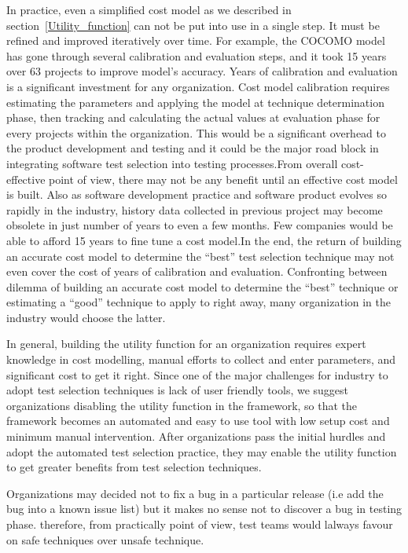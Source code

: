 In practice, even a simplified cost model as we described in
section~\ref{Utility_function} can not be put into use in a single step. It must
be refined and improved iteratively over time. For example, the COCOMO
model \cite{boehm2000software} has gone through several calibration and
evaluation steps, and it took 15 years over 63 projects to improve model's
accuracy. Years of calibration and evaluation is a significant investment for
any organization. Cost model calibration requires estimating the parameters and applying the model at technique determination phase, then tracking and calculating the actual values at evaluation phase for every projects within the organization. 
This would be a significant overhead to the product development and testing and
it could be the major road block in integrating software test selection into testing
processes.From overall cost-effective point of view, there may not be any
benefit until an effective cost model is built.
Also as software development practice and software product evolves so rapidly in the industry, history data collected in previous
project may become obsolete in just number of years to even a few months. Few
companies would be able to afford 15 years to fine tune a cost model.In the end, the return of building an accurate cost model
to determine the ``best'' test selection technique may not even cover the cost
of years of calibration and evaluation. Confronting between dilemma of building
an accurate cost model to determine the ``best'' technique or estimating a
``good'' technique to apply to right away, many organization in the industry
would choose the latter. 

In general, building the utility function for an organization requires 
expert knowledge in cost modelling, manual efforts to collect and enter
parameters, and significant cost to get it right. Since one of the major challenges for industry to adopt test selection techniques is lack of
user friendly tools\cite{4659253}, we suggest organizations disabling
the utility function in the framework, so that the framework becomes an automated and easy to use tool with
low setup cost and minimum manual intervention. After organizations pass the
initial hurdles and adopt the automated test selection practice, they may enable
the utility function to get greater benefits from test selection techniques.

 
Organizations may decided not to fix a bug in a particular release (i.e add the bug into a known issue list) but it makes no sense not to discover a bug in
testing phase. therefore, from practically point of view, test teams would
lalways favour on safe techniques over unsafe technique. 


